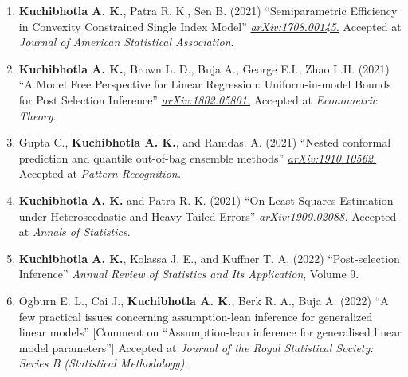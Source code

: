 \documentclass[10pt]{article}
\numberwithin{myalgctr}{section}
\begin{document}
\begin{enumerate}
\item \textbf{Kuchibhotla A. K.}, Patra R. K., Sen B. (2021) ``Semiparametric Efficiency in Convexity Constrained Single Index Model'' \href{https://arxiv.org/abs/1708.00145}{\emph{arXiv:1708.00145.}} Accepted at \emph{Journal of American Statistical Association}.
\item \textbf{Kuchibhotla A. K.}, Brown L. D., Buja A., George E.I., Zhao L.H. (2021) ``A Model Free Perspective for Linear Regression: Uniform-in-model Bounds for Post Selection Inference'' \href{https://arxiv.org/abs/1802.05801}{\emph{arXiv:1802.05801.}} Accepted at \emph{Econometric Theory}.
	\item Gupta C., \textbf{Kuchibhotla A. K.}, and Ramdas. A. (2021) ``Nested conformal prediction and quantile out-of-bag ensemble methods'' \href{https://arxiv.org/abs/1910.10562}{\emph{arXiv:1910.10562.}} Accepted at \emph{Pattern Recognition.}
	\item \textbf{Kuchibhotla A. K.} and Patra R. K. (2021) ``On Least Squares Estimation under Heteroscedastic and Heavy-Tailed Errors'' \href{https://arxiv.org/abs/1909.02088}{\emph{arXiv:1909.02088.}} Accepted at \emph{Annals of Statistics}.
	\item \textbf{Kuchibhotla A. K.}, Kolassa J. E., and Kuffner T. A. (2022) ``Post-selection Inference''  \emph{Annual Review of Statistics and Its Application}, Volume 9.
	\item Ogburn E. L., Cai J., \textbf{Kuchibhotla A. K.}, Berk R. A., Buja A. (2022) ``A few practical issues concerning assumption-lean inference for generalized linear models'' [Comment on ``Assumption-lean inference for generalised linear model
parameters''] Accepted at \emph{Journal of the Royal Statistical Society: Series B (Statistical Methodology)}.
\end{enumerate}
\end{document}
